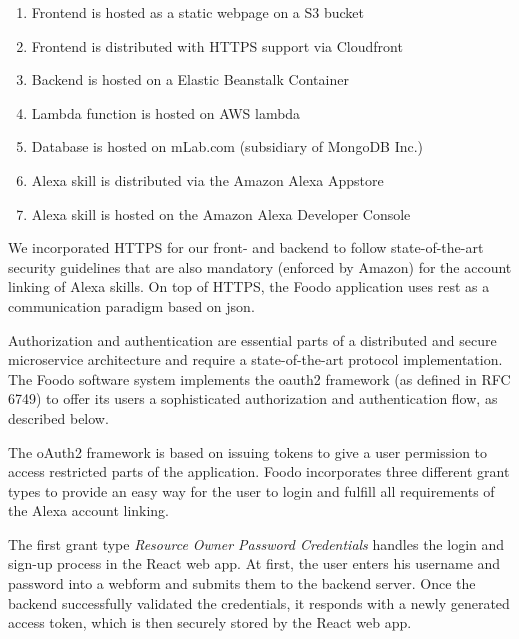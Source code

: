 \begin{enumerate}
	\itemsep-0.5em 
	\item Frontend is hosted as a static webpage on a S3 bucket
	\item Frontend is distributed with HTTPS support via Cloudfront
	\item Backend is hosted on a Elastic Beanstalk Container
	\item Lambda function is hosted on AWS lambda
	\item Database is hosted on mLab.com (subsidiary of MongoDB Inc.)
	\item Alexa skill is distributed via the Amazon Alexa Appstore 
	\item Alexa skill is hosted on the Amazon Alexa Developer Console
\end{enumerate}


We incorporated HTTPS for our front- and backend to follow state-of-the-art security guidelines that are also mandatory (enforced by Amazon) for the account linking of Alexa skills. On top of HTTPS, the Foodo application uses \gls{rest} as a communication paradigm based on \gls{json}.

Authorization and authentication are essential parts of a distributed and secure microservice architecture and require a state-of-the-art protocol implementation. The Foodo software system implements the \gls{oauth2} framework (as defined in RFC 6749) to offer its users a sophisticated authorization and authentication flow, as described below.  


The oAuth2 framework is based on issuing tokens to give a user permission to access restricted parts of the application. Foodo incorporates three different grant types to provide an easy way for the user to login and fulfill all requirements of the Alexa account linking. 

The first grant type \textit{Resource Owner Password Credentials} handles the login and sign-up process in the React web app. At first, the user enters his username and password into a webform and submits them to the backend server. Once the backend successfully validated the credentials, it responds with a newly generated access token, which is then securely stored by the React web app.

